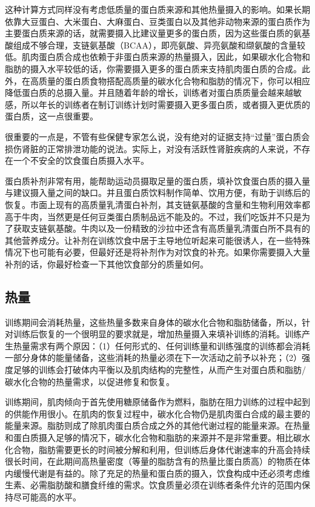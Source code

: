 这种计算方式同样没有考虑低质量的蛋白质来源和其他热量摄入的影响。如果长期依靠大豆蛋白、大米蛋白、大麻蛋白、豆类蛋白以及其他非动物来源的蛋白质作为主要蛋白质来源的话，就需要摄入比建议量更多的蛋白质，因为这些蛋白质的氨基酸组成不够合理，支链氨基酸（BCAA），即亮氨酸、异亮氨酸和缬氨酸的含量较低。肌肉蛋白质合成也依赖于非蛋白质来源的热量摄入，因此，如果碳水化合物和脂肪的摄入水平较低的话，你需要摄入更多的蛋白质来支持肌肉蛋白质的合成。此外，在高质量的蛋白质食物搭配高质量的碳水化合物和脂肪的情况下，你可以相应降低蛋白质的总摄入量。并且随着年龄的增长，训练者对蛋白质质量会越来越敏感，所以年长的训练者在制订训练计划时需要摄入更多蛋白质，或者摄入更优质的蛋白质，这一点很重要。

很重要的一点是，不管有些保健专家怎么说，没有绝对的证据支持“过量”蛋白质会损伤肾脏的正常排泄功能的说法。实际上，对没有活跃性肾脏疾病的人来说，不存在一个不安全的饮食蛋白质摄入水平。

蛋白质补剂非常有用，能帮助运动员摄取足量的蛋白质，填补饮食蛋白质的摄入量与建议摄入量之间的缺口。并且蛋白质饮料制作简单、饮用方便，有助于训练后的恢复。市面上现有的高质量乳清蛋白补剂，其支链氨基酸的含量和生物利用效率都高于牛肉，当然更是任何豆类蛋白质制品远不能及的。不过，我们吃饭并不只是为了获取支链氨基酸。牛肉以及一份精致的沙拉中还含有高质量乳清蛋白所不具有的其他营养成分。让补剂在训练饮食中居于主导地位听起来可能很诱人，在一些特殊情况下也可能有必要，但最好还是将补剂作为对饮食的补充。如果你需要摄入大量补剂的话，你最好检查一下其他饮食部分的质量如何。

\subsection{热量}

训练期间会消耗热量，这些热量多数来自身体的碳水化合物和脂肪储备，所以，针对训练后恢复的一个很明显的要求就是，增加热量摄入来填补训练的消耗。训练产生热量需求有两个原因：（1）任何形式的、任何训练量和训练强度的训练都会消耗一部分身体的能量储备，这些消耗的热量必须在下一次活动之前予以补充；（2）强度足够的训练会打破体内平衡以及肌肉结构的完整性，从而产生对蛋白质和脂肪/碳水化合物的热量需求，以促进修复和恢复。

训练期间，肌肉倾向于首先使用糖原储备作为燃料，脂肪在阻力训练的过程中起到的供能作用很小。在肌肉的恢复过程中，碳水化合物仍是肌肉蛋白合成的最主要的能量来源。脂肪则成了除肌肉蛋白质合成之外的其他代谢过程的能量来源。在热量和蛋白质摄入足够的情况下，碳水化合物和脂肪的来源并不是非常重要。相比碳水化合物，脂肪需要更长的时间被分解和利用，但训练后身体代谢速率的升高会持续很长时间，在此期间高热量密度（等量的脂肪含有的热量比蛋白质高）的物质在体内缓慢代谢是有益的。除了充足的热量和蛋白质的摄入，饮食构成中还必须考虑维生素、必需脂肪酸和膳食纤维的需求。饮食质量必须在训练者条件允许的范围内保持尽可能高的水平。

